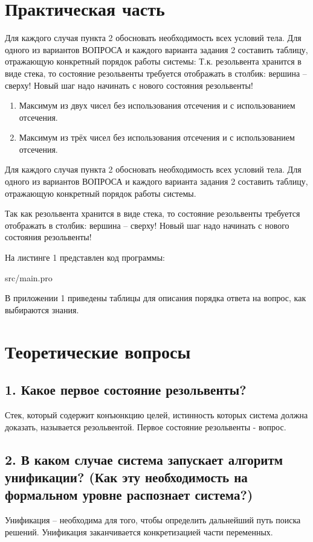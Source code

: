 \chapter*{Практическая часть}

Для каждого случая пункта 2 обосновать необходимость всех условий тела.
Для одного из вариантов ВОПРОСА и каждого варианта задания 2 составить
таблицу, отражающую конкретный порядок работы системы:
Т.к. резольвента хранится в виде стека, то состояние резольвенты требуется отображать
в столбик: вершина – сверху! Новый шаг надо начинать с нового состояния резольвенты!

\begin{enumerate}
	\item Максимум из двух чисел без использования отсечения и с использованием отсечения.
	\item Максимум из трёх чисел без использования отсечения и с использованием отсечения.
\end{enumerate}

Для каждого случая пункта 2 обосновать необходимость всех условий тела.
Для одного из вариантов ВОПРОСА и каждого варианта задания 2 составить таблицу, отражающую конкретный порядок работы системы.

Так как резольвента хранится в виде стека, то состояние резольвенты требуется отображать в столбик: вершина – сверху! Новый шаг надо начинать с нового состояния резольвенты!

На листинге 1 представлен код программы:

\FloatBarrier
\begin{lstinputlisting}[style={lsp}]{src/main.pro}
\end{lstinputlisting}
\FloatBarrier

В приложении 1 приведены таблицы для описания порядка ответа на вопрос, как выбираются знания.

\chapter*{Теоретические вопросы}

\section*{1. Какое первое состояние резольвенты?}
Стек, который содержит конъюнкцию целей, истинность которых система должна доказать, называется
резольвентой. Первое состояние резольвенты - вопрос.

\section*{2. В каком случае система запускает алгоритм унификации? (Как эту необходимость на формальном уровне распознает система?)}
Унификация – необходима для того, чтобы определить дальнейший путь поиска решений. Унификация заканчивается конкретизацией части переменных.

